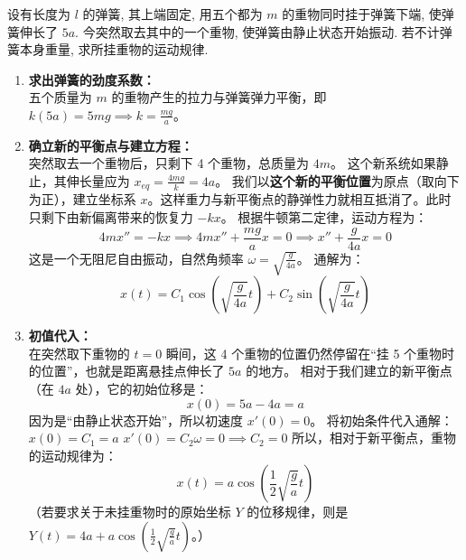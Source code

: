 \documentclass[lang=cn,11pt]{elegantbook}
\begin{document}
\begin{exercise}[平衡位置的改变及振动建模]
设有长度为 $l$ 的弹簧, 其上端固定, 用五个都为 $m$ 的重物同时挂于弹簧下端, 使弹簧伸长了 $5a$. 今突然取去其中的一个重物, 使弹簧由静止状态开始振动. 若不计弹簧本身重量, 求所挂重物的运动规律.
\end{exercise}
\begin{solution}
\begin{enumerate}
    \item \textbf{求出弹簧的劲度系数：}\\
    五个质量为 $m$ 的重物产生的拉力与弹簧弹力平衡，即 $k(5a) = 5mg \implies k = \frac{mg}{a}$。

    \item \textbf{确立新的平衡点与建立方程：}\\
    突然取去一个重物后，只剩下 4 个重物，总质量为 $4m$。
    这个新系统如果静止，其伸长量应为 $x_{eq} = \frac{4mg}{k} = 4a$。
    我们以\textbf{这个新的平衡位置}为原点（取向下为正），建立坐标系 $x$。这样重力与新平衡点的静弹性力就相互抵消了。此时只剩下由新偏离带来的恢复力 $-kx$。
    根据牛顿第二定律，运动方程为：
    \[
    4m x'' = -k x \implies 4m x'' + \frac{mg}{a}x = 0 \implies x'' + \frac{g}{4a}x = 0
    \]
    这是一个无阻尼自由振动，自然角频率 $\omega = \sqrt{\frac{g}{4a}}$。
    通解为：
    \[
    x(t) = C_1\cos\left(\sqrt{\frac{g}{4a}} t\right) + C_2\sin\left(\sqrt{\frac{g}{4a}} t\right)
    \]

    \item \textbf{初值代入：}\\
    在突然取下重物的 $t=0$ 瞬间，这 4 个重物的位置仍然停留在“挂 5 个重物时的位置”，也就是距离悬挂点伸长了 $5a$ 的地方。
    相对于我们建立的新平衡点（在 $4a$ 处），它的初始位移是：
    \[
    x(0) = 5a - 4a = a
    \]
    因为是“由静止状态开始”，所以初速度 $x'(0) = 0$。
    将初始条件代入通解：
    $x(0) = C_1 = a$
    $x'(0) = C_2\omega = 0 \implies C_2=0$
    所以，相对于新平衡点，重物的运动规律为：
    \[
    \boxed{x(t) = a\cos\left(\frac{1}{2}\sqrt{\frac{g}{a}} t\right)}
    \]
    （若要求关于未挂重物时的原始坐标 $Y$ 的位移规律，则是 $Y(t) = 4a + a\cos\left(\frac{1}{2}\sqrt{\frac{g}{a}} t\right)$。）
\end{enumerate}
\end{solution}
\end{document}
